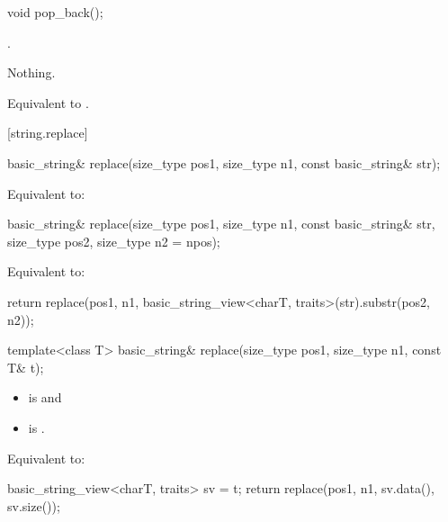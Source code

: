 %
\begin{itemdecl}
void pop_back();
\end{itemdecl}

\begin{itemdescr}
\pnum
\expects
{}.

\pnum
\throws Nothing.

\pnum
\effects
Equivalent to .
\end{itemdescr}

[string.replace]{}

%
\begin{itemdecl}
basic_string& replace(size_type pos1, size_type n1, const basic_string& str);
\end{itemdecl}

\begin{itemdescr}
\pnum
\effects Equivalent to: 
\end{itemdescr}

%
\begin{itemdecl}
basic_string& replace(size_type pos1, size_type n1, const basic_string& str,
                      size_type pos2, size_type n2 = npos);
\end{itemdecl}

\begin{itemdescr}
\pnum
\effects
Equivalent to:
\begin{codeblock}
return replace(pos1, n1, basic_string_view<charT, traits>(str).substr(pos2, n2));
\end{codeblock}
\end{itemdescr}

%
\begin{itemdecl}
template<class T>
  basic_string& replace(size_type pos1, size_type n1, const T& t);
\end{itemdecl}

\begin{itemdescr}
\pnum
\constraints
\begin{itemize}
\item
{} is
 and
\item
{} is
.
\end{itemize}

\pnum
\effects
Equivalent to:
\begin{codeblock}
basic_string_view<charT, traits> sv = t;
return replace(pos1, n1, sv.data(), sv.size());
\end{codeblock}
\end{itemdescr}


